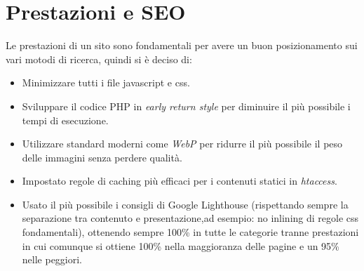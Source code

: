 \section{Prestazioni e SEO}

Le prestazioni di un sito sono fondamentali per avere un buon posizionamento sui vari motodi di ricerca, quindi si è deciso di:
\begin{itemize}
    \item Minimizzare tutti i file javascript e css.
    \item Sviluppare il codice PHP in \textit{early return style} per diminuire il più possibile i tempi di esecuzione.
    \item Utilizzare standard moderni come \textit{WebP} per ridurre il più possibile il peso delle immagini senza perdere qualità.
    \item Impostato regole di caching più efficaci per i contenuti statici in \textit{htaccess}.
    \item Usato il più possibile i consigli di Google Lighthouse (rispettando sempre la separazione tra contenuto e presentazione,ad  esempio: no inlining di regole css fondamentali), ottenendo sempre 100\% in tutte le categorie tranne prestazioni in cui comunque si ottiene 100\% nella maggioranza delle pagine e un 95\% nelle peggiori.
\end{itemize}
